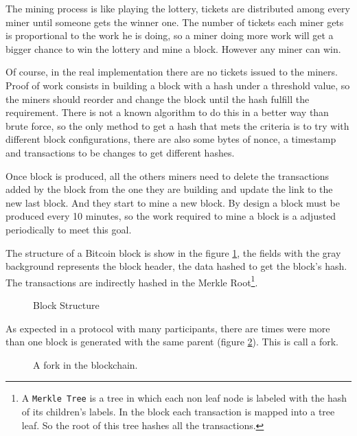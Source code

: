 The mining process is like playing the lottery, tickets are distributed  among
  every miner until someone gets the winner one. The number of tickets each
  miner gets is proportional to the work he is doing, so a miner doing more work
  will get a bigger chance to win the lottery and mine a block. However any miner
  can win.

Of course, in the real implementation there are no tickets issued to the
  miners.
Proof of work consists in building a block with a hash under a threshold value,
  so the miners should reorder and change the block until the hash fulfill the
  requirement.
There is not a known algorithm to do this in a better way than
  brute force, so the only method to get a hash that mets the criteria is to try
  with different block configurations, there are also some bytes of nonce, a
  timestamp and transactions to be changes to get different hashes.

Once block is produced, all the others miners need to delete the transactions
  added by the block from the one they are building and update the link to the
  new last block. And they start to mine a new block.
By design a block must be produced every 10 minutes, so the work required to
  mine a block is a adjusted periodically to meet this goal.

The structure of a Bitcoin block is show in the figure \ref{fig:block_pow}, the
  fields with the gray background represents the block header, the data hashed
  to get the block's hash.
The transactions are indirectly hashed in the Merkle Root\footnote{A
  \texttt{Merkle Tree} is a tree in which each non leaf node is labeled with
  the hash of its children's labels. In the block each transaction is mapped
  into a tree leaf. So the root of this tree hashes all the transactions.}.

  \begin{figure}[ht]
	\centering
	
	\caption{Block Structure}
	\label{fig:block_pow}
\end{figure}

As expected in a protocol with many participants, there are times were more
  than one block is generated with the same parent (figure
  \ref{fig:chain_fork}). This is call a fork.

\begin{figure}
	\centering
	\def\svgwidth{\columnwidth}
	
	\caption{A fork in the blockchain.}
	\label{fig:chain_fork}
\end{figure}

